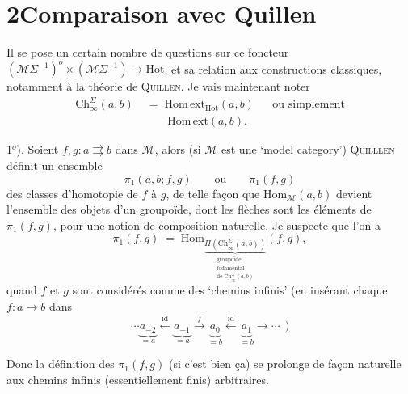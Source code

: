 \documentclass[11pt]{article}
\newcommand{\printedpage}[1]{\marginpar{\footnotesize p.~#1}}
\newcommand{\msp}[1]{\marginpar{\footnotesize [#1]}}
\newcommand{\M}{\mathcal{M}}
\newcommand{\Hot}{\mathrm{Hot}}
\newcommand{\Ch}{\mathrm{Ch}}
\newcommand{\uCh}{\underline{\mathrm{Ch}}}
\newcommand{\Homext}{\mathrm{Hom\,ext}}
\begin{document}
\printedpage{9}

\msp{page 14}

\section*{2\quad Comparaison avec Quillen}

Il se pose un certain nombre de questions sur ce foncteur $(\M\Sigma^{-1})^o \times (\M\Sigma^{-1}) \longrightarrow \Hot$, et sa relation aux constructions classiques, notamment à la théorie de \textsc{Quillen}. Je vais maintenant noter
\[
\begin{aligned}
\Ch^{\Sigma}_{\infty}(a,b) \;&=\; \Homext_{\Hot}(a,b) && \text{ou simplement}\\
&\phantom{\;=\;} \Homext(a,b).
\end{aligned}
\]

1$^o$). Soient $f,g : a \rightrightarrows b$ dans $\M$, alors (si $\M$ est une `model category') \textsc{Quilllen} définit un ensemble %
\[
\pi_1(a,b;f,g) \qquad \text{ou} \qquad \pi_1(f,g)
\]
des classes d'homotopie de $f$ à $g$, de telle façon que $\mathrm{Hom}_{\M}(a,b)$ devient l'ensemble des objets d'un groupoïde, dont les flèches sont les éléments de $\pi_1(f,g)$, pour une notion de composition naturelle. Je suspecte que l'on a
\[
\pi_1(f,g) \;=\; \mathrm{Hom}_{\underbrace{\Pi(\uCh^{\Sigma}_{\infty}(a,b))}_{\substack{\text{groupoïde}\\ \text{fodamental}\\ \text{de } \uCh^{\Sigma}_{\infty}(a,b)}}}(f,g), %
\]
quand $f$ et $g$ sont considérés comme des `chemins infinis' (en insérant chaque $f : a \longrightarrow b$ dans
\[
\cdots \underbrace{a_{-2}}_{=a} \xleftarrow{\ \mathrm{id}\ } \underbrace{a_{-1}}_{=a} \xrightarrow{\ f\ } \underbrace{a_{0}}_{=b} \xleftarrow{\ \mathrm{id}\ } \underbrace{a_{1}}_{=b} \longrightarrow \cdots\ \ )
\]

\msp{page 15}

Donc la définition des $\pi_1(f,g)$ (si c'est bien ça) se prolonge de façon naturelle aux chemins infinis (essentiellement finis) arbitraires.
\end{document}
